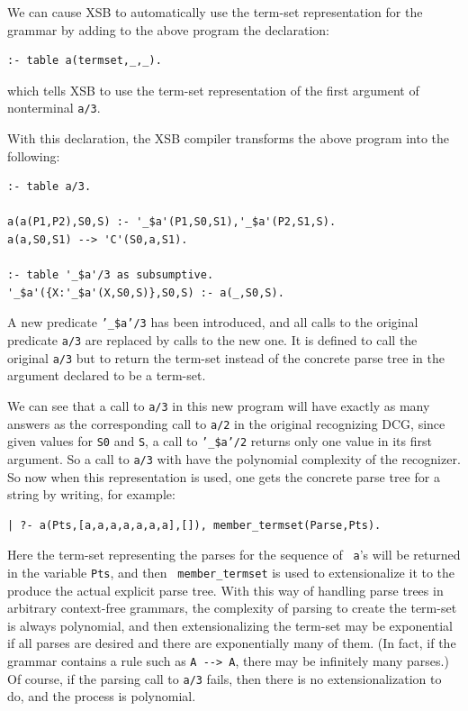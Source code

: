 We can cause XSB to automatically use the term-set representation for
the grammar by adding to the above program the declaration:
\begin{verbatim}
:- table a(termset,_,_).
\end{verbatim}
which tells XSB to use the term-set representation of the first
argument of nonterminal {\tt a/3}.

With this declaration, the XSB compiler transforms the above program
into the following:
\begin{verbatim}
:- table a/3.

a(a(P1,P2),S0,S) :- '_$a'(P1,S0,S1),'_$a'(P2,S1,S).
a(a,S0,S1) --> 'C'(S0,a,S1).

:- table '_$a'/3 as subsumptive.
'_$a'({X:'_$a'(X,S0,S)},S0,S) :- a(_,S0,S).
\end{verbatim}
A new predicate {\tt '\_\$a'/3} has been introduced, and all calls to the
original predicate {\tt a/3} are replaced by calls to the new one.  It
is defined to call the original {\tt a/3} but to return the term-set
instead of the concrete parse tree in the argument declared to be a
term-set.

We can see that a call to {\tt a/3} in this new program will have
exactly as many answers as the corresponding call to {\tt a/2} in the
original recognizing DCG, since given values for {\tt S0} and {\tt S},
a call to {\tt '\_\$a'/2} returns only one value in its first
argument.  So a call to {\tt a/3} with have the polynomial complexity
of the recognizer.  So now when this representation is used, one gets
the concrete parse tree for a string by writing, for example:
\begin{verbatim}
| ?- a(Pts,[a,a,a,a,a,a,a],[]), member_termset(Parse,Pts).
\end{verbatim}
Here the term-set representing the parses for the sequence of {\tt
a}'s will be returned in the variable {\tt Pts}, and then {\tt
member\_termset} is used to extensionalize it
to the produce the actual explicit parse
tree.  With this way of handling parse trees in arbitrary context-free
grammars, the complexity of parsing to create the term-set is always
polynomial, and then extensionalizing the term-set may be exponential
if all parses are desired and there are exponentially many of them.
(In fact, if the grammar contains a rule such as \verb|A --> A|, there
may be infinitely many parses.)
Of course, if the parsing call to {\tt a/3} fails, then there is no
extensionalization to do, and the process is polynomial.


